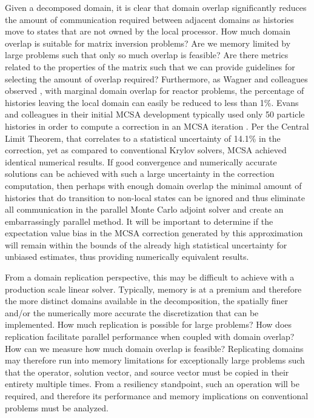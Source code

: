 Given a decomposed domain, it is clear that domain overlap
significantly reduces the amount of communication required between
adjacent domains as histories move to states that are not owned by the
local processor. How much domain overlap is suitable for matrix
inversion problems? Are we memory limited by large problems such that
only so much overlap is feasible? Are there metrics related to the
properties of the matrix such that we can provide guidelines for
selecting the amount of overlap required? Furthermore, as Wagner and
colleagues observed \citep{wagner_hybrid_2010}, with marginal domain
overlap for reactor problems, the percentage of histories leaving the
local domain can easily be reduced to less than 1\%. Evans and
colleagues in their initial MCSA development typically used only 50
particle histories in order to compute a correction in an MCSA
iteration \citep{evans_monte_2012}. Per the Central Limit Theorem,
that correlates to a statistical uncertainty of 14.1\% in the
correction, yet as compared to conventional Krylov solvers, MCSA
achieved identical numerical results. If good convergence and
numerically accurate solutions can be achieved with such a large
uncertainty in the correction computation, then perhaps with enough
domain overlap the minimal amount of histories that do transition to
non-local states can be ignored and thus eliminate all communication
in the parallel Monte Carlo adjoint solver and create an embarrassingly
parallel method. It will be important to determine if the expectation
value bias in the MCSA correction generated by this approximation will
remain within the bounds of the already high statistical uncertainty
for unbiased estimates, thus providing numerically equivalent results.

From a domain replication perspective, this may be difficult to
achieve with a production scale linear solver. Typically, memory is at
a premium and therefore the more distinct domains available in the
decomposition, the spatially finer and/or the numerically more
accurate the discretization that can be implemented. How much
replication is possible for large problems? How does replication
facilitate parallel performance when coupled with domain overlap? How
can we measure how much domain overlap is feasible? Replicating
domains may therefore run into memory limitations for exceptionally
large problems such that the operator, solution vector, and source
vector must be copied in their entirety multiple times. From a
resiliency standpoint, such an operation will be required, and
therefore its performance and memory implications on conventional
problems must be analyzed.

